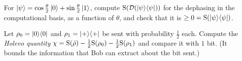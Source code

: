 \begin{exerciseset}
   For $\left|\psi\right\rangle=\cos\frac\theta2\left|0\right\rangle+\sin\frac\theta2\left|1\right\rangle$, compute $\mathrm{S}(\mathcal D(\left|\psi\right\rangle\!\left\langle\psi\right|))$ for the dephasing in the computational basis, as a function of $\theta$, and check that it is $\ge0=\mathrm{S}(\left|\psi\right\rangle\!\left\langle\psi\right|)$.

   Let $\rho_0=\left|0\right\rangle\!\left\langle0\right|$ and $\rho_1=\left|+\right\rangle\!\left\langle+\right|$ be sent with probability $\tfrac12$ each. Compute the \emph{Holevo quantity} $\chi=\mathrm{S}(\bar\rho)-\tfrac12\mathrm{S}(\rho_0)-\tfrac12\mathrm{S}(\rho_1)$ and compare it with $1$ bit. (It bounds the information that Bob can extract about the bit sent.)
\end{exerciseset}
